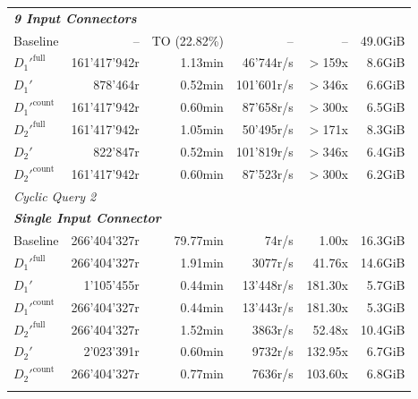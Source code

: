 \begin{longtable}{lrrrrr}
    \multicolumn{6}{l}{\textit{\textbf{9 Input Connectors}}} \\
    \nopagebreak
    Baseline              &  --                   &  TO (22.82\%)       &  --                  & --                & 49.0GiB   \\
    $D_1'^{\text{full}}$   &  161'417'942r         &  1.13min            &  46'744r/s           & $>$159x           & 8.6GiB    \\
    \quad $D_1'$           &  878'464r             &  0.52min            &  101'601r/s           & $>$346x           & 6.6GiB    \\
    $D_1'^{\text{count}}$  &  161'417'942r         &  0.60min            &  87'658r/s           & $>$300x           & 6.5GiB    \\
    $D_2'^{\text{full}}$   &  161'417'942r         &  1.05min            &  50'495r/s           & $>$171x           & 8.3GiB    \\
    \quad $D_2'$           &  822'847r             &  0.52min            &  101'819r/s          & $>$346x           & 6.4GiB    \\
    $D_2'^{\text{count}}$  &  161'417'942r         &  0.60min            &  87'523r/s           & $>$300x           & 6.2GiB    \\
    \midrule

    \multicolumn{6}{l}{\textit{Cyclic Query 2}} \\
    \midrule
    \multicolumn{6}{l}{\textit{\textbf{Single Input Connector}}} \\
    \nopagebreak
    Baseline              &  266'404'327r         &  79.77min           &  74r/s               & 1.00x             & 16.3GiB   \\
    $D_1'^{\text{full}}$   &  266'404'327r         &  1.91min            &  3077r/s             & 41.76x            & 14.6GiB   \\
    \quad $D_1'$           &  1'105'455r           &  0.44min            &  13'448r/s           & 181.30x           & 5.7GiB    \\
    $D_1'^{\text{count}}$  &  266'404'327r         &  0.44min            &  13'443r/s           & 181.30x           & 5.3GiB    \\
    $D_2'^{\text{full}}$   &  266'404'327r         &  1.52min            &  3863r/s             & 52.48x            & 10.4GiB   \\
    \quad $D_2'$           &  2'023'391r           &  0.60min            &  9732r/s             & 132.95x           & 6.7GiB    \\
    $D_2'^{\text{count}}$  &  266'404'327r         &  0.77min            &  7636r/s             & 103.60x           & 6.8GiB    \\
    \addlinespace
    

\end{longtable}
